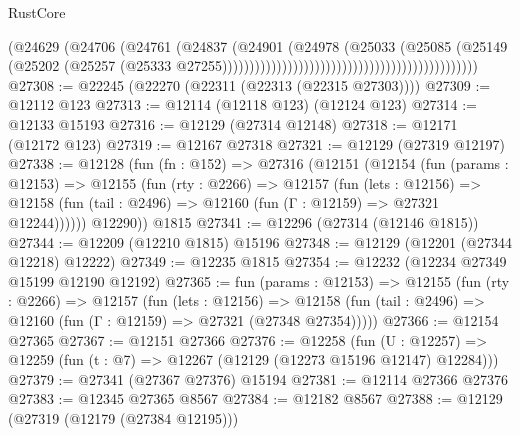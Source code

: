 \begin{lexlean}{RustCore}
\begin{coremodule}
                                                                          (@24629
                                                                            (@24706
                                                                              (@24761
                                                                                (@24837
                                                                                  (@24901
                                                                                    (@24978
                                                                                      (@25033
                                                                                        (@25085
                                                                                          (@25149
                                                                                            (@25202
                                                                                              (@25257
                                                                                                (@25333
                                                                                                  @27255)))))))))))))))))))))))))))))))))))))))))))))))
@27308 := @22245 (@22270 (@22311 (@22313 (@22315 @27303))))
@27309 := @12112 @123
@27313 := @12114 (@12118 @123) (@12124 @123)
@27314 := @12133 @15193
@27316 := @12129 (@27314 @12148)
@27318 := @12171 (@12172 @123)
@27319 := @12167 @27318
@27321 := @12129 (@27319 @12197)
@27338 := @12128
    (fun (fn : @152) =>
    @27316
      (@12151
        (@12154
          (fun (params : @12153) =>
          @12155
            (fun (rty : @2266) =>
            @12157
              (fun (lets : @12156) =>
              @12158 (fun (tail : @2496) => @12160 (fun (Γ : @12159) => @27321 @12244))))))
        @12290))
    @1815
@27341 := @12296 (@27314 (@12146 @1815))
@27344 := @12209 (@12210 @1815) @15196
@27348 := @12129 (@12201 (@27344 @12218) @12222)
@27349 := @12235 @1815
@27354 := @12232 (@12234 @27349 @15199 @12190 @12192)
@27365 := fun (params : @12153) =>
  @12155
    (fun (rty : @2266) =>
    @12157
      (fun (lets : @12156) =>
      @12158 (fun (tail : @2496) => @12160 (fun (Γ : @12159) => @27321 (@27348 @27354)))))
@27366 := @12154 @27365
@27367 := @12151 @27366
@27376 := @12258
    (fun (U : @12257) => @12259 (fun (t : @7) => @12267 (@12129 (@12273 @15196 @12147) @12284)))
@27379 := @27341 (@27367 @27376) @15194
@27381 := @12114 @27366 @27376
@27383 := @12345 @27365 @8567
@27384 := @12182 @8567
@27388 := @12129 (@27319 (@12179 (@27384 @12195)))

\end{coremodule}
\end{lexlean}
